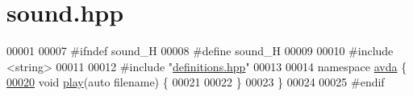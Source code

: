\hypertarget{sound_8hpp_source}{\section{sound.\+hpp}
\label{sound_8hpp_source}
}

\begin{DoxyCode}
00001 
00007 \textcolor{preprocessor}{#ifndef sound\_H}
00008 \textcolor{preprocessor}{#define sound\_H}
00009 
00010 \textcolor{preprocessor}{#include <string>}
00011 
00012 \textcolor{preprocessor}{#include "\hyperlink{definitions_8hpp}{definitions.hpp}"}
00013 
00014 \textcolor{keyword}{namespace }\hyperlink{namespaceavda}{avda} \{
\hypertarget{sound_8hpp_source_l00020}{}\hyperlink{namespaceavda_a34f661f9a357bb68b0aa3662cc821e4d}{00020}     \textcolor{keywordtype}{void} \hyperlink{namespaceavda_a34f661f9a357bb68b0aa3662cc821e4d}{play}(\textcolor{keyword}{auto} filename) \{
00021 
00022     \}
00023 \}
00024 
00025 \textcolor{preprocessor}{#endif}
\end{DoxyCode}
